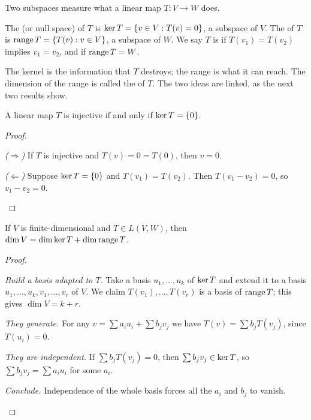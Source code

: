 Two subspaces measure what a linear map $T:V\to W$ does.

\begin{definition}\label{def:kerran}
  The  (or null space) of $T$ is $\operatorname{ker} T=\{v\in V:T(v)=0\}$, a subspace of $V$. The  of $T$ is $\operatorname{range} T=\{T(v):v\in V\}$, a subspace of $W$. We say $T$ is  if $T(v_1)=T(v_2)$ implies $v_1=v_2$, and  if $\operatorname{range} T=W$.
\end{definition}

The kernel is the information that $T$ destroys; the range is what it can reach. The dimension of the range is called the  of $T$. The two ideas are linked, as the next two results show.

\begin{theorem}\label{thm:inj-ker}
  A linear map $T$ is injective if and only if $\operatorname{ker} T=\{0\}$.
\end{theorem}
\begin{proof}
  \begin{steps}
    \item \emph{($\Rightarrow$)} If $T$ is injective and $T(v)=0=T(0)$, then $v=0$.
    \item \emph{($\Leftarrow$)} Suppose $\operatorname{ker} T=\{0\}$ and $T(v_1)=T(v_2)$. Then $T(v_1-v_2)=0$, so $v_1-v_2=0$. \qedhere
  \end{steps}
\end{proof}

\begin{theorem}\label{thm:ranknull}
  If $V$ is finite-dimensional and $T\in L(V,W)$, then $\dim V=\dim\operatorname{ker} T+\dim\operatorname{range} T$.
\end{theorem}
\begin{proof}
  \begin{steps}
    \item \emph{Build a basis adapted to $T$.} Take a basis $u_1,\dots,u_k$ of $\operatorname{ker} T$ and extend it to a basis $u_1,\dots,u_k,v_1,\dots,v_r$ of $V$. We claim $T(v_1),\dots,T(v_r)$ is a basis of $\operatorname{range} T$; this gives $\dim V=k+r$.
    \item \emph{They generate.} For any $v=\sum a_iu_i+\sum b_jv_j$ we have $T(v)=\sum b_jT(v_j)$, since $T(u_i)=0$.
    \item \emph{They are independent.} If $\sum b_jT(v_j)=0$, then $\sum b_jv_j\in\operatorname{ker} T$, so $\sum b_jv_j=\sum a_iu_i$ for some $a_i$.
    \item \emph{Conclude.} Independence of the whole basis forces all the $a_i$ and $b_j$ to vanish. \qedhere
  \end{steps}
\end{proof}

